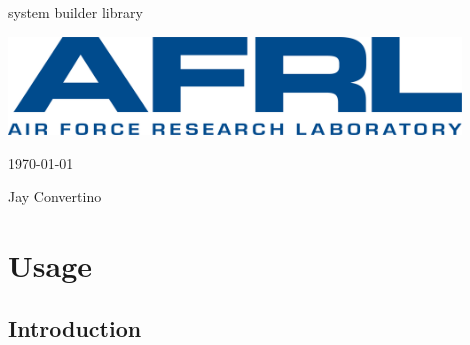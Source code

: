 \begin{titlepage}
  \begin{center}

  {\Huge system builder library}

  \vspace{25mm}

  \includegraphics[width=0.90\textwidth,height=\textheight,keepaspectratio]{img/AFRL.png}

  \vspace{25mm}

  \today

  \vspace{15mm}

  {\Large Jay Convertino}

  \end{center}
\end{titlepage}

\tableofcontents

\newpage

\section{Usage}

\subsection{Introduction}

